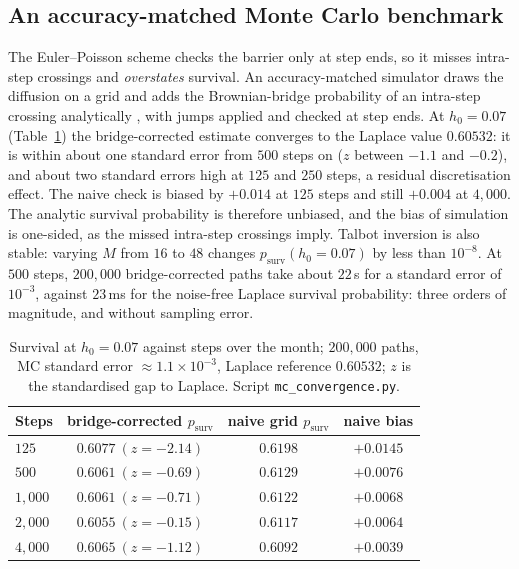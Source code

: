 \documentclass[11pt]{article}
\theoremstyle{plain}
\theoremstyle{definition}
\theoremstyle{remark}
\begin{document}
\subsection{An accuracy-matched Monte Carlo benchmark}\label{sec:mc-benchmark}
The Euler--Poisson scheme checks the barrier only at step ends, so it misses intra-step crossings and
\emph{overstates} survival. An accuracy-matched simulator draws the diffusion on a grid and adds the
Brownian-bridge probability of an intra-step crossing analytically \citep{Glasserman2004}, with jumps
applied and checked at step ends. At $h_0=0.07$ (Table~\ref{tab:mcconv}) the bridge-corrected
estimate converges to the Laplace value $0.60532$: it is within about one standard error from
$500$ steps on ($z$ between $-1.1$ and $-0.2$), and about two standard errors high at $125$ and
$250$ steps, a residual discretisation effect. The naive check is biased by $+0.014$ at $125$ steps
and still $+0.004$ at $4{,}000$. The analytic survival probability is therefore unbiased, and the
bias of simulation is one-sided, as the missed intra-step crossings imply. Talbot inversion is also
stable: varying $M$ from $16$ to $48$ changes $p_{\mathrm{surv}}(h_0{=}0.07)$ by less than
$10^{-8}$. At $500$ steps, $200{,}000$ bridge-corrected paths take about $22$\,s for a standard
error of $10^{-3}$, against $23$\,ms for the noise-free Laplace survival probability: three orders
of magnitude, and without sampling error.

\begin{table}[ht]
\centering\small
\begin{tabular}{lccc}
\toprule
Steps & bridge-corrected $p_{\mathrm{surv}}$ & naive grid $p_{\mathrm{surv}}$ & naive bias \\
\midrule
$125$   & $0.6077\ (z{=}{-}2.14)$ & $0.6198$ & $+0.0145$ \\
$500$   & $0.6061\ (z{=}{-}0.69)$ & $0.6129$ & $+0.0076$ \\
$1{,}000$ & $0.6061\ (z{=}{-}0.71)$ & $0.6122$ & $+0.0068$ \\
$2{,}000$ & $0.6055\ (z{=}{-}0.15)$ & $0.6117$ & $+0.0064$ \\
$4{,}000$ & $0.6065\ (z{=}{-}1.12)$ & $0.6092$ & $+0.0039$ \\
\bottomrule
\end{tabular}
\caption{Survival at $h_0=0.07$ against steps over the month; $200{,}000$ paths, MC standard error
${\approx}1.1\times10^{-3}$, Laplace reference $0.60532$; $z$ is the standardised gap to Laplace.
Script \texttt{mc\_convergence.py}.}
\label{tab:mcconv}
\end{table}
\end{document}
